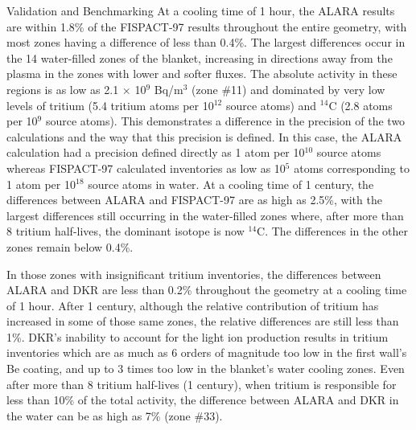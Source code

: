 \begin{chapter}{Validation and Benchmarking}
At a cooling time of 1 hour, the ALARA results are within 1.8\% of the
FISPACT-97 results throughout the entire geometry, with most zones
having a difference of less than 0.4\%.  The largest differences occur
in the 14 water-filled zones of the blanket, increasing in directions
away from the plasma in the zones with lower and softer fluxes.  The
absolute activity in these regions is as low as 2.1 $\times$ 10$^9$
Bq/m$^3$ (zone \#11) and dominated by very low levels of tritium (5.4
tritium atoms per 10$^{12}$ source atoms) and $^{14}$C (2.8 atoms per
10$^9$ source atoms).  This demonstrates a difference in the precision
of the two calculations and the way that this precision is defined.
In this case, the ALARA calculation had a precision defined directly
as 1 atom per 10$^{10}$ source atoms whereas FISPACT-97 calculated
inventories as low as 10$^{5}$ atoms corresponding to 1 atom per
10$^{18}$ source atoms in water.  At a cooling time of 1 century, the
differences between ALARA and FISPACT-97 are as high as 2.5\%, with
the largest differences still occurring in the water-filled zones
where, after more than 8 tritium half-lives, the dominant isotope is
now $^{14}$C.  The differences in the other zones remain below 0.4\%.

In those zones with insignificant tritium inventories, the differences
between ALARA and DKR are less than 0.2\% throughout the geometry at a
cooling time of 1 hour.  After 1 century, although the relative
contribution of tritium has increased in some of those same zones, the
relative differences are still less than 1\%.  DKR's inability to
account for the light ion production results in tritium inventories
which are as much as 6 orders of magnitude too low in the first wall's
Be coating, and up to 3 times too low in the blanket's water cooling
zones.  Even after more than 8 tritium half-lives (1
century), when tritium is responsible for less than 10\% of the total
activity, the difference between ALARA and DKR in the water can be as
high as 7\% (zone \#33).


\end{chapter}
